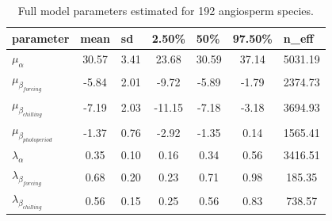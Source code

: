 \documentclass{article}\usepackage[]{graphicx}\usepackage[]{color}
\begin{document}
\begin{table}[H]
\begin{center}
\caption{Full model parameters estimated for 192 angiosperm species.}
\begin{tabular}{@{}lcccccc@{}}
\toprule
\textbf{parameter}             & \multicolumn{1}{l}{\textbf{mean}} & \multicolumn{1}{l}{\textbf{sd}} & \multicolumn{1}{l}{\textbf{2.50\%}} & \multicolumn{1}{l}{\textbf{50\%}} & \multicolumn{1}{l}{\textbf{97.50\%}} & \multicolumn{1}{l}{\textbf{n\_eff}} \\ \midrule
$\mu_\alpha$                   & 30.57                             & 3.41                            & 23.68                               & 30.59                             & 37.14                                & 5031.19                             \\
$\mu_\beta_{forcing}$          & -5.84                             & 2.01                            & -9.72                               & -5.89                             & -1.79                                & 2374.73                             \\
$\mu_\beta_{chilling}$         & -7.19                             & 2.03                            & -11.15                              & -7.18                             & -3.18                                & 3694.93                             \\
$\mu_\beta_{photoperiod}$      & -1.37                             & 0.76                            & -2.92                               & -1.35                             & 0.14                                 & 1565.41                             \\
$\lambda_\alpha$               & 0.35                              & 0.10                            & 0.16                                & 0.34                              & 0.56                                 & 3416.51                             \\
$\lambda_\beta_{forcing}$      & 0.68                              & 0.20                            & 0.23                                & 0.71                              & 0.98                                 & 185.35                              \\
$\lambda_\beta_{chilling}$     & 0.56                              & 0.15                            & 0.25                                & 0.56                              & 0.83                                 & 738.57                              \\

\end{tabular}
\end{center}
\end{table}
\end{document}
